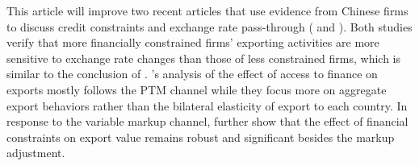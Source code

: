This article will improve two recent articles that use evidence from Chinese firms to discuss credit constraints and exchange rate pass-through (\cite{dai2021} and \cite{xu-guo2021}). Both studies verify that more financially constrained firms' exporting activities are more sensitive to exchange rate changes than those of less constrained firms, which is similar to the conclusion of \cite{strasser2013}. \cite{dai2021}'s analysis of the effect of access to finance on exports mostly follows the PTM channel while they focus more on aggregate export behaviors rather than the bilateral elasticity of export to each country. In response to the variable markup channel, \cite{xu-guo2021} further show that the effect of financial constraints on export value remains robust and significant besides the markup adjustment. 

\newpage
